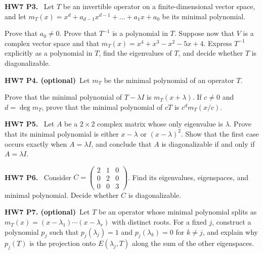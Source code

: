 \documentclass[10pt]{scrartcl}
\newenvironment{prob}{\par\bigskip\noindent\begin{minipage}{\linewidth}\setlength{\parskip}{4pt}}{\end{minipage}\par}
\begin{document}
\begin{prob}
\textbf{HW7 P3. }\ Let $T$ be an invertible operator on a finite-dimensional vector space, and let $m_T(x)=x^d+a_{d-1}x^{d-1}+\dots+a_1x+a_0$ be its minimal polynomial.
\begin{enumerate}[(a)]
  \ii Prove that $a_0\ne0$.
  \ii Prove that $T^{-1}$ is a polynomial in $T$.
  \ii Suppose now that $V$ is a complex vector space and that $m_T(x)=x^4+x^3-x^2-5x+4$. Express $T^{-1}$ explicitly as a polynomial in $T$, find the eigenvalues of $T$, and decide whether $T$ is diagonalizable.
\end{enumerate}
\end{prob}

\begin{prob}
\textbf{HW7 P4. (optional)}\ Let $m_T$ be the minimal polynomial of an operator $T$.
\begin{enumerate}[(a)]
  \ii Prove that the minimal polynomial of $T-\lambda I$ is $m_T(x+\lambda)$.
  \ii If $c\ne0$ and $d=\deg m_T$, prove that the minimal polynomial of $cT$ is $c^dm_T(x/c)$.
\end{enumerate}
\end{prob}

\begin{prob}
\textbf{HW7 P5. }\ Let $A$ be a $2\times2$ complex matrix whose only eigenvalue is $\lambda$. Prove that its minimal polynomial is either $x-\lambda$ or $(x-\lambda)^2$. Show that the first case occurs exactly when $A=\lambda I$, and conclude that $A$ is diagonalizable if and only if $A=\lambda I$.
\end{prob}

\begin{prob}
\textbf{HW7 P6. }\ Consider $C=\begin{pmatrix}2&1&0\\0&2&0\\0&0&3\end{pmatrix}$. Find its eigenvalues, eigenspaces, and minimal polynomial. Decide whether $C$ is diagonalizable.
\end{prob}

\begin{prob}
\textbf{HW7 P7. (optional)}\ Let $T$ be an operator whose minimal polynomial splits as $m_T(x)=(x-\lambda_1)\cdots(x-\lambda_r)$ with distinct roots. For a fixed $j$, construct a polynomial $p_j$ such that $p_j(\lambda_j)=1$ and $p_j(\lambda_k)=0$ for $k\ne j$, and explain why $p_j(T)$ is the projection onto $E(\lambda_j,T)$ along the sum of the other eigenspaces.
\end{prob}
\end{document}
